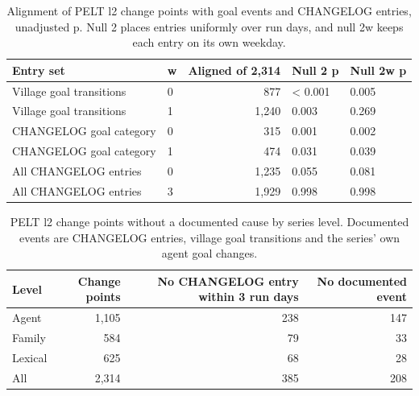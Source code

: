 \documentclass{arxivtmpl}
\begin{document}
\begin{table}[htbp]
\centering
\small
\caption{Alignment of PELT l2 change points with goal events and CHANGELOG entries, unadjusted p. Null 2 places entries uniformly over run days, and null 2w keeps each entry on its own weekday.}
\begin{tabular}{llrll}
\toprule
Entry set & w & Aligned of 2,314 & Null 2 p & Null 2w p \\
\midrule
Village goal transitions & 0 & 877 & < 0.001 & 0.005 \\
Village goal transitions & 1 & 1,240 & 0.003 & 0.269 \\
CHANGELOG goal category & 0 & 315 & 0.001 & 0.002 \\
CHANGELOG goal category & 1 & 474 & 0.031 & 0.039 \\
All CHANGELOG entries & 0 & 1,235 & 0.055 & 0.081 \\
All CHANGELOG entries & 3 & 1,929 & 0.998 & 0.998 \\
\bottomrule
\end{tabular}
\end{table}

\begin{table}[htbp]
\centering
\small
\caption{PELT l2 change points without a documented cause by series level. Documented events are CHANGELOG entries, village goal transitions and the series' own agent goal changes.}
\begin{tabular}{lrrr}
\toprule
Level & Change points & No CHANGELOG entry within 3 run days & No documented event \\
\midrule
Agent & 1,105 & 238 & 147 \\
Family & 584 & 79 & 33 \\
Lexical & 625 & 68 & 28 \\
All & 2,314 & 385 & 208 \\
\bottomrule
\end{tabular}
\end{table}
\end{document}
